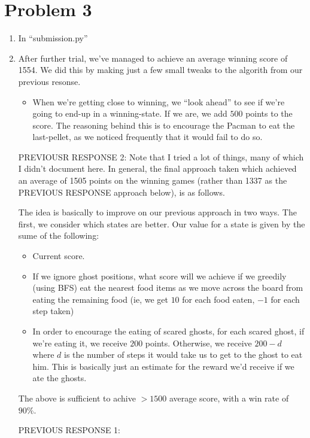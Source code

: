 \documentclass[12pt]{article}
\begin{document}
\section*{Problem 3}
\begin{enumerate}[label=(\alph*)]
  \item In ``submission.py''
  \item After further trial, we've managed to achieve an average winning score of 1554. We did this by making just a few small tweaks to the algorith from our previous resonse.

  \begin{itemize}
    \item When we're getting close to winning, we ``look ahead'' to see if we're going to end-up in a winning-state. If we are, we add $500$ points to the score. The reasoning behind this is to encourage the Pacman to eat the last-pellet, as we noticed frequently that it would fail to do so.
  \end{itemize}


  PREVIOUSR RESPONSE 2:
  Note that I tried a lot of things, many of which I didn't document here. In general, the final approach taken which achieved an average of 1505 points on the winning games (rather than 1337 as the PREVIOUS RESPONSE approach below), is as follows.

  The idea is basically to improve on our previous approach in two ways. The first, we consider which states are better. Our value for a state is given by the sume of the following:
  \begin{itemize}
    \item Current score.
    \item If we ignore ghost positions, what score will we achieve if we greedily (using BFS) eat the nearest food items as we move across the board from eating the remaining food (ie, we get $10$ for each food eaten, $-1$ for each step taken)
    \item In order to encourage the eating of scared ghosts, for each scared ghost, if we're eating it, we receive $200$ points. Otherwise, we receive $200 -d$ where $d$ is the number of steps it would take us to get to the ghost to eat him. This is basically just an estimate for the reward we'd receive if we ate the ghosts.
  \end{itemize}

  The above is sufficient to achive $>1500$ average score, with a win rate of $90\%$.


  PREVIOUS RESPONSE 1:


\end{enumerate}
\end{document}
